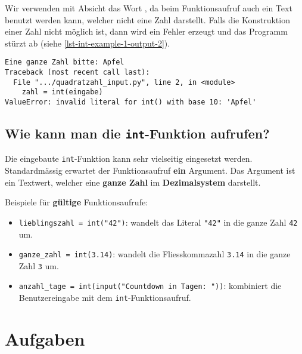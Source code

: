 Wir verwenden mit Absicht das Wort , da beim Funktionsaufruf auch ein Text benutzt werden kann, welcher nicht eine Zahl darstellt. Falls die Konstruktion einer Zahl nicht möglich ist, dann wird ein Fehler erzeugt und das Programm stürzt ab (siehe \autoref{lst-int-example-1-output-2}).

\begin{lstlisting}[language=output, caption={Beispielausführung für das Programm aus \autoref{lst-int-example-1} mit falscher Eingabe.}, label={lst-int-example-1-output-2}]
Eine ganze Zahl bitte: Apfel
Traceback (most recent call last):
  File ".../quadratzahl_input.py", line 2, in <module>
    zahl = int(eingabe)
ValueError: invalid literal for int() with base 10: 'Apfel'
\end{lstlisting}

\vspace{-0.5cm}

\subsection{Wie kann man die \lstinline{int}-Funktion aufrufen?}

Die eingebaute \lstinline{int}-Funktion kann sehr vielseitig eingesetzt werden. Standardmässig erwartet der Funktionsaufruf \textbf{ein} Argument. Das Argument ist ein Textwert, welcher eine \textbf{ganze Zahl} im \textbf{Dezimalsystem} darstellt. 

\begin{example}
Beispiele für \textbf{gültige} Funktionsaufrufe:
\begin{itemize}
\item \lstinline{lieblingszahl = int("42")}: wandelt das Literal \lstinline{"42"} in die ganze Zahl \lstinline{42} um.
\item \lstinline{ganze_zahl = int(3.14)}: wandelt die Fliesskommazahl \lstinline{3.14} in die ganze Zahl \lstinline{3} um.
\item \lstinline{anzahl_tage = int(input("Countdown in Tagen: "))}: kombiniert die Benutzereingabe mit dem \lstinline{int}-Funktionsaufruf.
\end{itemize}
\end{example}

\vspace{-1cm}

\section{Aufgaben}

